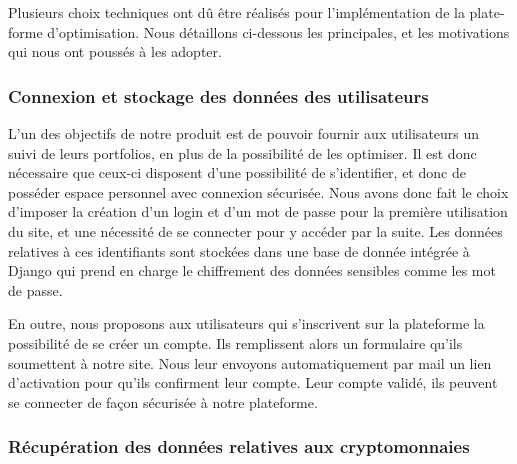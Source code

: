 \documentclass[a4paper, 10pt]{article}
\begin{document}
Plusieurs choix techniques ont dû être réalisés pour l'implémentation de la plate-forme d'optimisation. Nous détaillons ci-dessous les principales, et les motivations qui nous ont poussés à les adopter.

\subsubsection{Connexion et stockage des données des utilisateurs}
\label{sec:developpement_choix_stockage}

L'un des objectifs de notre produit est de pouvoir fournir aux utilisateurs un suivi de leurs portfolios, en plus de la possibilité de les optimiser. Il est donc nécessaire que ceux-ci disposent d'une possibilité de s'identifier, et donc de posséder espace personnel avec connexion sécurisée. Nous avons donc fait le choix d'imposer la création d'un login et d'un mot de passe pour la première utilisation du site, et une nécessité de se connecter pour y accéder par la suite. Les données relatives à ces identifiants sont stockées dans une base de donnée intégrée à Django qui prend en charge le chiffrement des données sensibles comme les mot de passe.

En outre, nous proposons aux utilisateurs qui s’inscrivent sur la plateforme la possibilité de se créer un compte. Ils remplissent alors un formulaire qu’ils soumettent à notre site. Nous leur envoyons automatiquement par mail un lien d’activation pour qu’ils confirment leur compte. Leur compte validé, ils peuvent se connecter de façon sécurisée à notre plateforme.

\subsubsection{Récupération des données relatives aux cryptomonnaies}
\label{sec:developpement_choix_data}
\end{document}
